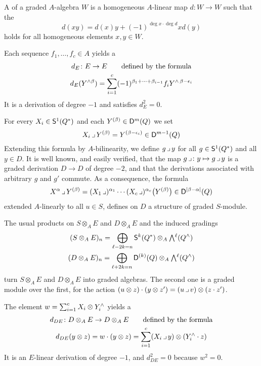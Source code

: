 A {\it{}\/} of a graded $A$-algebra $W$ is a
homogeneous $A$-linear map $d\colon W\to W$ such that the
{\it{}\/}
\[
d(x y) = d(x) y + (-1)^{\deg x\cdot\deg d} x d(y)
\]
holds for all homogeneous elements $x,y\in W$.

\begin{construction}
\label{koszul}
Each sequence $f_1,\dots,f_c\in A$ yields a {\it{}\/}
\[
\begin{gathered}
d_E \colon E \to E
\qquad\text{defined by the formula}\\
d_E(Y^{\wedge\beta}) =
\sum_{i=1}^c (-1)^{\beta_1+\cdots+\beta_{i-1}}f_iY^{\wedge\, \beta-\epsilon_i}
\end{gathered}
\]
It is a derivation of degree $-1$ and satisfies $d_E^2 = 0$.
 \end{construction}

\begin{construction}
\label{actions}
For every $X_i\in{\mathsf S}^1(Q^*)$ and each $Y^{(\beta)} \in {\mathsf D}^{m}(Q)$ we set
\[
X_i \operatorname{\lrcorner} Y^{(\beta)} = Y^{(\beta-\epsilon_i)} \in {\mathsf D}^{{m}-1}(Q)
\]
Extending this formula by $A$-bilinearity, we define $g\operatorname{\lrcorner} y$ for 
all $g\in{\mathsf S}^1(Q^*)$ and all $y\in D$.  It is well known, and easily
verified, that the map $g\operatorname{\lrcorner}\colon y\mapsto g\operatorname{\lrcorner} y$ is a
graded derivation $D\to D$ of degree $-2$, and that the derivations
associated with arbitrary $g$ and $g'$ commute.  As a consequence, the
formula
\[
X^\alpha\operatorname{\lrcorner} Y^{(\beta)} =
(X_1\operatorname{\lrcorner})^{\alpha_1}\cdots(X_c\operatorname{\lrcorner})^{\alpha_c}\big(Y^{(\beta)}\big)
\in{\mathsf D}^{|\beta-\alpha|}(Q)
\]
extended $A$-linearly to all $u\in S$, defines on $D$ a structure of
graded $S$-module.

The usual products on $S\otimes_AE$ and $D\otimes_A E$ and the induced
gradings
\begin{gather*}
(S\otimes_AE)_n=
\bigoplus_{\ell-2k=n}{\mathsf S}^{k}(Q^*)\otimes_A {\textstyle\bigwedge\limits}{}^{\ell}(Q^\wedge)\\
(D\otimes_AE)_n=
\bigoplus_{\ell+2k=n}{\mathsf D}^{(k)}(Q)\otimes_A {\textstyle\bigwedge\limits}{}^{\ell}(Q^\wedge)
\end{gather*}
turn $S\otimes_AE$ and $D\otimes_A E$ into graded algebras.  The
second one is a graded module over the first, for the action
$(u\otimes z)\cdot(y\otimes z')=(u\operatorname{\lrcorner} v)\otimes(z\cdot z')$.
  \end{construction}

\begin{construction}
\label{cartan}
The element $w=\sum_{i=1}^c X_i\otimes Y_i^\wedge$ yields a {\it{}\/} 
\[
\begin{gathered}
d_{DE} \colon D \otimes_A E \to D \otimes_A E
\qquad\text{defined by the formula}\\
d_{DE}( y \otimes z ) = w\cdot(y \otimes z)
= \sum_{i=1}^c (X_i \operatorname{\lrcorner} y) \otimes (Y_i^\wedge\cdot z)
\end{gathered}
\]
It is an $E$-linear derivation of degree $-1$, and $d_{DE}^2 = 0$
because $w^2=0$.  
 \end{construction}

